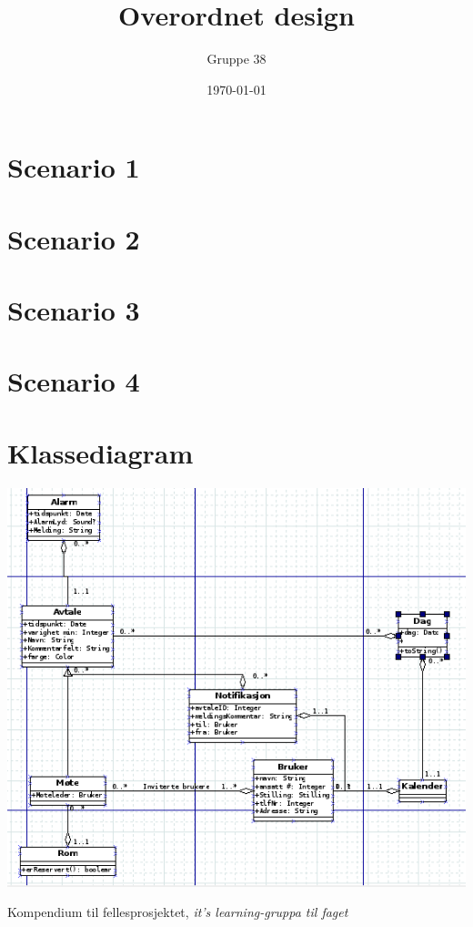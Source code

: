 \documentclass[titlepage]{article}
\author{Gruppe 38}
\title{Overordnet design}
\date{\today}
\begin{document}
\maketitle

\tableofcontents

\newpage
\section{Scenario 1}


\newpage
\section{Scenario 2}


\newpage
\section{Scenario 3}


\newpage
\section{Scenario 4}


\newpage
\section{Klassediagram}
\includegraphics[scale=0.75]{Klassediagram.png}

\newpage
\listoftables

\newpage
\listoffigures

\newpage
\begin{thebibliography}{9}

	Kompendium til fellesprosjektet,
	\emph{it's learning-gruppa til faget}
\end{thebibliography}
\end{document}
